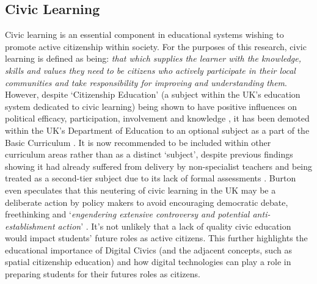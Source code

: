 \subsection{Civic Learning}
Civic learning is an essential component in educational systems wishing to promote active citizenship within society. For the purposes of this research, civic learning is defined as being: \textit{that which supplies the learner with the knowledge, skills and values they need to be citizens who actively participate in their local communities and take responsibility for improving and understanding them}. However, despite `Citizenship Education’ (a subject within the UK’s education system dedicated to civic learning) being shown to have positive influences on political efficacy, participation, involvement and knowledge \citep{whiteley2012}, it has been demoted within the UK’s Department of Education to an optional subject as a part of the Basic Curriculum \citep{GovEducation2011}. It is now recommended to be included within other curriculum areas rather than as a distinct `subject’, despite previous findings showing it had already suffered from delivery by non-specialist teachers and being treated as a second-tier subject due to its lack of formal assessments \citep{Burton2015, Ofsted2013}. Burton even speculates that this neutering of civic learning in the UK may be a deliberate action by policy makers to avoid encouraging democratic debate, freethinking and ‘\textit{engendering extensive controversy and potential anti-establishment action}’ \citep{Burton2015}. It's not unlikely that a lack of quality civic education would impact students' future roles as active citizens. This further highlights the educational importance of Digital Civics (and the adjacent concepts, such as spatial citizenship education) and how digital technologies can play a role in preparing students for their futures roles as citizens.

